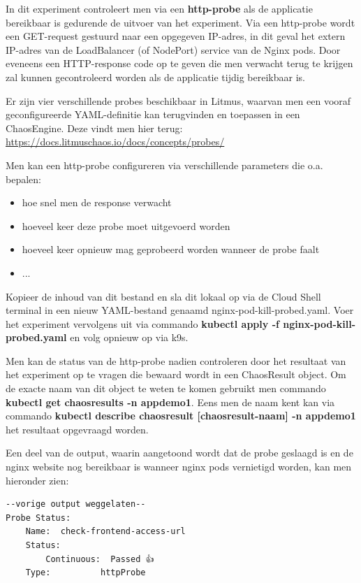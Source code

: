 In dit experiment controleert men via een {\bf http-probe} als de applicatie bereikbaar is gedurende de uitvoer van het experiment. Via een http-probe wordt een GET-request gestuurd naar een opgegeven IP-adres, in dit geval het extern IP-adres van de LoadBalancer (of NodePort) service van de Nginx pods. Door eveneens een HTTP-response code op te geven die men verwacht terug te krijgen zal kunnen gecontroleerd worden als de applicatie tijdig bereikbaar is. 

Er zijn vier verschillende probes beschikbaar in Litmus, waarvan men een vooraf geconfigureerde YAML-definitie kan terugvinden en toepassen in een ChaosEngine. Deze vindt men hier terug: \url{https://docs.litmuschaos.io/docs/concepts/probes/} 

Men kan een http-probe configureren via verschillende parameters die o.a. bepalen:
\begin{itemize}
    \item hoe snel men de response verwacht
    \item hoeveel keer deze probe moet uitgevoerd worden
    \item hoeveel keer opnieuw mag geprobeerd worden wanneer de probe faalt
    \item ...
\end{itemize}
    
Kopieer de inhoud van dit bestand en sla dit lokaal op via de Cloud Shell terminal in een nieuw YAML-bestand genaamd nginx-pod-kill-probed.yaml. Voer het experiment vervolgens uit via commando {\bf kubectl apply -f nginx-pod-kill-probed.yaml} en volg opnieuw op via k9s. 

Men kan de status van de http-probe nadien controleren door het resultaat van het experiment op te vragen die bewaard wordt in een ChaosResult object. Om de exacte naam van dit object te weten te komen gebruikt men commando {\bf kubectl get chaosresults -n appdemo1}. \newline Eens men de naam kent kan via commando {\bf kubectl describe chaosresult [chaosresult-naam] -n appdemo1} het resultaat opgevraagd worden.

Een deel van de output, waarin aangetoond wordt dat de probe geslaagd is en de nginx website nog bereikbaar is wanneer nginx pods vernietigd worden, kan men hieronder zien: 
\begin{lstlisting}
--vorige output weggelaten--    
Probe Status:
    Name:  check-frontend-access-url
    Status:
        Continuous:  Passed 👍   
    Type:          httpProbe
\end{lstlisting}

